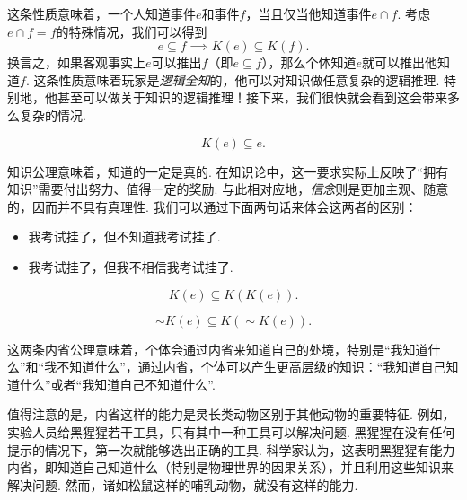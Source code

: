 这条性质意味着，一个人知道事件$e$和事件$f$，当且仅当他知道事件$e\cap f$. 考虑$e\cap f=f$的特殊情况，我们可以得到
\[e\subseteq f\implies K(e)\subseteq K(f).\]
换言之，如果客观事实上$e$可以推出$f$（即$e\subseteq f$），那么个体知道$e$就可以推出他知道$f$. 这条性质意味着玩家是\emph{逻辑全知}的，他可以对知识做任意复杂的逻辑推理. 特别地，他甚至可以做关于知识的逻辑推理！接下来，我们很快就会看到这会带来多么复杂的情况. 

\begin{proposition}
    \begin{equation}
        K(e)\subseteq e.\tag{K2}\label{eq:K2-knowledge}
    \end{equation}
\end{proposition}
知识公理意味着，知道的一定是真的. 在知识论中，这一要求实际上反映了“拥有知识”需要付出努力、值得一定的奖励. 与此相对应地，\emph{信念}则是更加主观、随意的，因而并不具有真理性. 我们可以通过下面两句话来体会这两者的区别：
    \begin{itemize}
        \item 我考试挂了，但不知道我考试挂了.
        \item 我考试挂了，但我不相信我考试挂了.
    \end{itemize}

\begin{proposition}[正内省公理]
    \begin{equation}
        K(e)\subseteq K(K(e)).\tag{K3}\label{eq:K3-positive-introspection}
    \end{equation}
\end{proposition}

\begin{proposition}[负内省公理]
    \begin{equation}
        \sim K(e)\subseteq K(\sim K(e)).\tag{K4}\label{eq:K4-negative-introspection}
    \end{equation}
\end{proposition}

这两条内省公理意味着，个体会通过内省来知道自己的处境，特别是“我知道什么”和“我不知道什么”，通过内省，个体可以产生更高层级的知识：“我知道自己知道什么”或者“我知道自己不知道什么”. 

值得注意的是，内省这样的能力是灵长类动物区别于其他动物的重要特征. 例如，实验人员给黑猩猩若干工具，只有其中一种工具可以解决问题. 黑猩猩在没有任何提示的情况下，第一次就能够选出正确的工具. 科学家认为，这表明黑猩猩有能力内省，即知道自己知道什么（特别是物理世界的因果关系），并且利用这些知识来解决问题. 然而，诸如松鼠这样的哺乳动物，就没有这样的能力.


